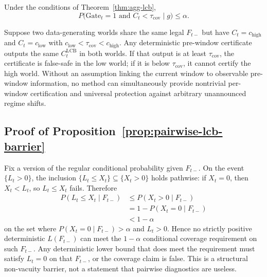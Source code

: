 \begin{corollary}
\label{cor:false-safe-gate}
Under the conditions of Theorem~\ref{thm:agg-lcb},
\begin{equation}
 P\bigl(\mathrm{Gate}_t=1\text{ and }C_t<\tau_{\mathrm{cov}}\mid g\bigr)
 \le\alpha.
 \label{eq:agg_cor2}
\end{equation}
\end{corollary}

\begin{proposition}
\label{prop:drift-boundary}
Suppose two data-generating worlds share the same legal $F_{t-}$ but have
$C_t=c_{\mathrm{high}}$ and $C_t=c_{\mathrm{low}}$ with
$c_{\mathrm{low}}<\tau_{\mathrm{cov}}<c_{\mathrm{high}}$.  Any deterministic
pre-window certificate outputs the same $C^{\mathrm{LCB}}_t$ in both worlds.
If that output is at least $\tau_{\mathrm{cov}}$, the certificate is
false-safe in the low world; if it is below $\tau_{\mathrm{cov}}$, it cannot
certify the high world.  Without an assumption linking the current window to
observable pre-window information, no method can simultaneously provide
nontrivial per-window certification and universal protection against
arbitrary unannounced regime shifts.
\end{proposition}

\subsection{Proof of Proposition~\ref{prop:pairwise-lcb-barrier}}
\label{app:proof_pairwise_lcb}

Fix a version of the regular conditional probability given $F_{t-}$.  On the
event $\{L_t>0\}$, the inclusion $\{L_t\le X_t\}\subseteq\{X_t>0\}$ holds
pathwise: if $X_t=0$, then $X_t<L_t$, so $L_t\le X_t$ fails.  Therefore
\begin{align*}
P(L_t\le X_t\mid F_{t-})
&\le
P(X_t>0\mid F_{t-}) \\
&=
1-P(X_t=0\mid F_{t-}) \\
&<
1-\alpha
\end{align*}
on the set where $P(X_t=0\mid F_{t-})>\alpha$ and $L_t>0$.  Hence no strictly
positive deterministic $L(F_{t-})$ can meet the $1-\alpha$ conditional coverage
requirement on such $F_{t-}$.  Any deterministic lower bound that does meet
the requirement must satisfy $L_t=0$ on that $F_{t-}$, or the coverage claim
is false.  This is a structural non-vacuity barrier, not a statement that
pairwise diagnostics are useless.


